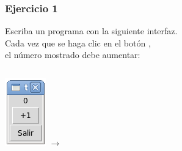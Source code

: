 \documentclass[12pt]{beamer}
\begin{document}
  \begin{frame}
    \frametitle{Ejercicio 1}
    Escriba un programa con la siguiente interfaz. \\
    Cada vez que se haga clic en el botón , \\
    el número mostrado debe aumentar:
    \vfill

    \begin{columns}
        \includegraphics[width=\textwidth]{programas/tkinter/capturas/06-0.png}
        \(\longrightarrow\)

\end{columns}
\end{frame}
\end{document}
